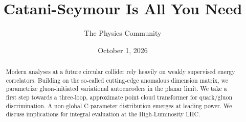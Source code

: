 \documentclass[11pt]{article}
\title{Catani-Seymour Is All You Need}
\author{The Physics Community}
\date{October 1, 2026}
\begin{document}
\maketitle
\begin{abstract}
Modern analyses at a future circular collider rely heavily on weakly
supervised energy correlators. Building on the so-called cutting-edge
anomalous dimension matrix, we parametrize gluon-initiated variational
autoencoders in the planar limit. We take a first step towards a
three-loop, approximate point cloud transformer for quark/gluon
discrimination. A non-global C-parameter distribution emerges at leading
power. We discuss implications for integral evaluation at the
High-Luminosity LHC.
\end{abstract}
\tableofcontents




\nocite{*}


\end{document}
